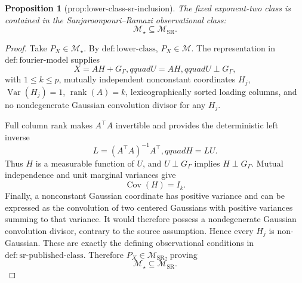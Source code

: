 \documentclass{article}
\newtheorem{proposition}{Proposition}
\begin{document}
\begin{proposition}[prop:lower-class-sr-inclusion]\label{prop:lower-class-sr-inclusion}
The fixed exponent-two class is contained in the Sanjaroonpouri--Ramazi observational class:
\[
 \mathcal M_\star\subseteq\mathcal M_{\mathrm{SR}}.
\]
\end{proposition}
\begin{proof}
Take \(P_X\in\mathcal M_\star\).  By \(\mathrm{def:lower\text{-}class}\), \(P_X\in\mathcal M\).  The representation in \(\mathrm{def:fourier\text{-}model}\) supplies
\[
 X=AH+G_\Gamma,qquad U=AH,qquad U\perp G_\Gamma,
\]
with \(1\le k\le p\), mutually independent nonconstant coordinates \(H_j\), \(\operatorname{Var}(H_j)=1\), \(\operatorname{rank}(A)=k\), lexicographically sorted loading columns, and no nondegenerate Gaussian convolution divisor for any \(H_j\).

Full column rank makes \(A^\top A\) invertible and provides the deterministic left inverse
\[
 L=(A^\top A)^{-1}A^\top,qquad H=LU.
\]
Thus \(H\) is a measurable function of \(U\), and \(U\perp G_\Gamma\) implies \(H\perp G_\Gamma\).  Mutual independence and unit marginal variances give
\[
 \operatorname{Cov}(H)=I_k.
\]
Finally, a nonconstant Gaussian coordinate has positive variance and can be expressed as the convolution of two centered Gaussians with positive variances summing to that variance.  It would therefore possess a nondegenerate Gaussian convolution divisor, contrary to the source assumption.  Hence every \(H_j\) is non-Gaussian.  These are exactly the defining observational conditions in \(\mathrm{def:sr\text{-}published\text{-}class}\).  Therefore \(P_X\in\mathcal M_{\mathrm{SR}}\), proving
\[
 \mathcal M_\star\subseteq\mathcal M_{\mathrm{SR}}.
\]
\end{proof}
\end{document}

